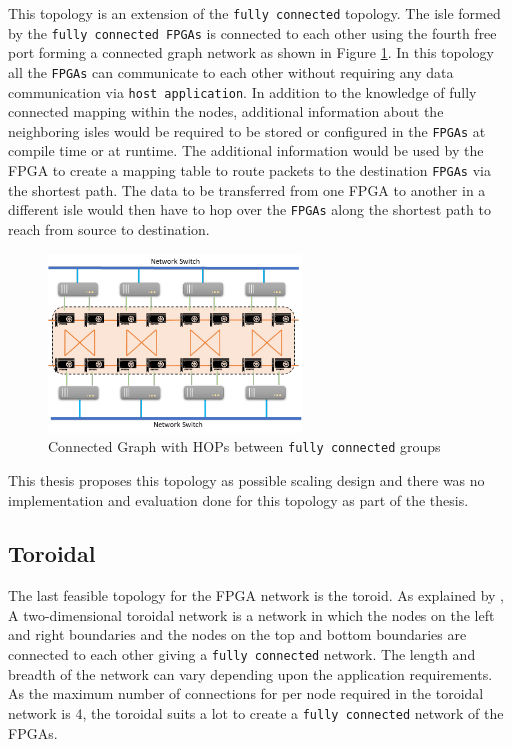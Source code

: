This topology is an extension of the \texttt{fully connected} topology.
The isle formed by the \texttt{fully connected FPGAs} is connected
to each other using the fourth free port forming a connected graph network
as shown in Figure \ref{fig:connected_graph}.
In this topology all the \texttt{FPGAs} can communicate to each other without requiring
any data communication via \texttt{host application}. In addition to the knowledge of fully
connected mapping within the nodes, additional information about the neighboring
isles would be required to be stored or configured in the \texttt{FPGAs} at compile time
or at runtime. The additional information would be used by the FPGA to create
a mapping table to route packets to the destination \texttt{FPGAs} via the shortest path.
The data to be transferred from one FPGA to another in a different isle would
then have to hop over the \texttt{FPGAs} along the shortest path to reach
from source to destination.

\begin{figure}[h]%
    \centering
    \includegraphics[width=0.6\textwidth]{images/connected_graph}
    \caption{Connected Graph with HOPs between \texttt{fully connected} groups}
    \label{fig:connected_graph}
\end{figure}

This thesis proposes this topology as possible scaling design and there was no
implementation and evaluation done for this topology as part of the thesis.

\subsection{Toroidal}
\label{sec:toroidal}

The last feasible topology for the FPGA network is the toroid. As explained by
\textcite{robertazzi_toroidal_1988}, A two-dimensional toroidal network is
a network in which the nodes on the left and right boundaries and the
nodes on the top and bottom boundaries are connected to each other giving
a \texttt{fully connected} network. The length and breadth of the network can vary
depending upon the application requirements. As the maximum number of
connections for per node required in the toroidal network is 4, the toroidal
suits a lot to create a \texttt{fully connected} network of the FPGAs.

